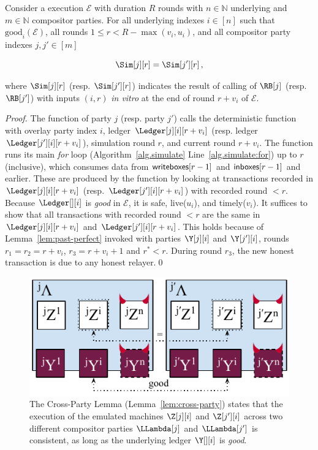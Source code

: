 \begin{lemma}\label{lem:cross-party}
  Consider a \rollerblade execution $\mathcal{E}$ with duration $R$ rounds
  with $n \in \mathbb{N}$ underlying
  and $m \in \mathbb{N}$ compositor parties.
  For
  all underlying indexes $i \in [n]$ such that $\text{good}_i(\mathcal{E})$,
  all rounds $1 \leq r < R - \max(v_i, u_i)$,
  and
  all compositor party indexes $j, j' \in [m]$

  \[
    \Sim[j][r] = \Sim[j'][r]\,,
  \]

  where $\Sim[j][r]$ (resp. $\Sim[j'][r]$) indicates the result of calling
  \emulateMachine of $\RB[j]$ (resp. $\RB[j']$) with inputs
  $(i, r)$
  \emph{in vitro} at the end of round $r + v_i$ of $\mathcal{E}$.
\end{lemma}
\begin{proof}
  The function \emulateMachine of party $j$ (resp. party $j'$)
  calls the deterministic function \simulate with overlay party index $i$,
  ledger $\Ledger[j][i][r + v_i]$ (resp. ledger $\Ledger[j'][i][r + v_i]$), simulation round
  $r$, and current round $r + v_i$. The function \simulate runs its main
  \emph{for} loop (Algorithm~\ref{alg.simulate} Line~\ref{alg.simulate:for})
  up to $r$ (inclusive), which consumes data from $\textsf{writeboxes}[r - 1]$
  and $\textsf{inboxes}[r - 1]$ and earlier. These are produced by the function
  \prepareSimulationInputs by looking at transactions recorded in $\Ledger[j][i][r + v_i]$
  (resp. $\Ledger[j'][i][r + v_i]$) with recorded round $< r$.
  Because $\Ledger[][i]$ is \emph{good} in $\mathcal{E}$, it is safe, live($u_i$), and timely($v_i$).
  It suffices to show that all transactions with recorded round
  $< r$ are the same in $\Ledger[j][i][r + v_i]$ and $\Ledger[j'][i][r + v_i]$.
  This holds because of Lemma~\ref{lem:past-perfect} invoked with parties $\Y[j][i]$ and $\Y[j'][i]$,
  rounds $r_1 = r_2 = r + v_i$, $r_3 = r + v_i + 1$ and $r^* < r$.
  During round $r_3$, the new honest transaction is due to any honest
  relayer.\qed
\end{proof}

\begin{figure}
  \centering
  \includegraphics[width=0.6 \textwidth,keepaspectratio]{figures/rollerblade-cross-party.pdf}
  \caption{The Cross-Party Lemma (Lemma~\ref{lem:cross-party}) states that
  the execution of the emulated machines $\Z[j][i]$ and $\Z[j'][i]$
  across two different compositor parties $\LLambda[j]$ and $\LLambda[j']$
  is consistent, as long as the underlying ledger $\Y[][i]$ is \emph{good}.}
  \label{fig.cross-party}
\end{figure}

